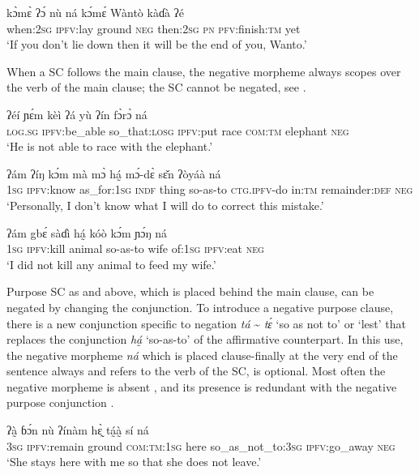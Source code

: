 \documentclass[output=paper,colorlinks=true, citecolor=brown]{langscibook}
\begin{document}
\ea\label{ex:gba:54}
    \gll  kɔ̀mɛ̀ ʔɔ́ nù ná kɔ́mɛ́ Wàntò kàɗà ʔé \\ 
          when:\textsc{2sg} \textsc{ipfv}:lay ground \textsc{neg} then:\textsc{2sg} \textsc{pn} \textsc{pfv}:finish:\textsc{tm} yet \\
    \glt ‘If you don’t lie down then it will be the end of you, Wanto.’
\z 

When a SC follows the main clause, the negative morpheme always scopes over the verb of the main clause; the SC cannot be negated, see .

\ea\label{ex:gba:55}
    \gll ʔéí ɲɛ́m kèì ʔá yù ʔín fɔ̀rɔ̀ ná \\ 
         \textsc{log.sg} \textsc{ipfv:}be\_able so\_that:\textsc{losg} \textsc{ipfv}:put race \textsc{com}:\textsc{tm} elephant \textsc{neg} \\
    \glt ‘He is not able to race with the elephant.’
\z 

\ea\label{ex:gba:56}
    \gll ʔám ʔíŋ kɔ́m mà mɔ̀ há̰  mɔ́-dɛ̀ sɛ̌n ʔòyáà ná \\ 
         \textsc{1sg} \textsc{ipfv}:know as\_for:\textsc{1sg} \textsc{indf} thing so-as-to \textsc{ctg.ipfv}-do in:\textsc{tm} remainder:\textsc{def} \textsc{neg} \\
    \glt ‘Personally, I don’t know what I will do to correct this mistake.’
\z


\ea\label{ex:gba:57}
    \gll ʔám gbɛ́ sàɗì há̰  kóò kɔ́m ɲɔ́ŋ ná \\ 
         \textsc{1sg} \textsc{ipfv}:kill animal so-as-to wife of:1\textsc{sg} \textsc{ipfv}:eat \textsc{neg} \\
    \glt ‘I did not kill any animal to feed my wife.’
\z 

Purpose SC as  and  above, which is placed behind the main clause, can be negated by changing the conjunction. To introduce a negative purpose clause, there is a new conjunction specific to negation \textit{tá} {\textasciitilde} \textit{tɛ́} ‘so as not to’ or ‘lest’ that replaces the conjunction \textit{há̰} ‘so-as-to’ of the affirmative counterpart. In this use, the negative morpheme \textit{ná} which is placed clause-finally at the very end of the sentence always and refers to the verb of the SC, is optional. Most often the negative morpheme is absent , and its presence is redundant with the negative purpose conjunction .

\ea\label{ex:gba:58}
    \gll  ʔà̰	ɓɔ́n nù ʔínàm hɛ̰̀ tá̰à̰  sí ná \\ 
          \textsc{3sg} \textsc{ipfv}:remain ground \textsc{com:tm:1sg} here so\_as\_not\_to:\textsc{3sg} \textsc{ipfv}:go\_away \textsc{neg} \\ 
    \glt ‘She stays here with me so that she does not leave.’
\z 
\end{document}
